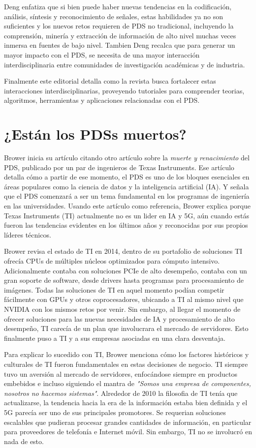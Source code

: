 \documentclass[11pt, twocolumn]{article}
\begin{document}
Deng enfatiza que si bien puede haber nuevas tendencias en la codificación, análisis, síntesis y reconocimiento de señales, estas habilidades ya no son suficientes y los nuevos retos requieren de PDS no tradicional, incluyendo la comprensión, minería y extracción de información de alto nivel muchas veces inmersa en fuentes de bajo nivel. Tambien Deng recalca que para generar un mayor impacto con el PDS, se necesita de una mayor interacción interdisciplinaria entre comunidades de investigación académicas y de industria.

Finalmente este editorial detalla como la revista busca fortalecer estas interacciones interdisciplinarias, proveyendo tutoriales para comprender teorias, algoritmos, herramientas y aplicaciones relacionadas con el PDS.

\section{¿Están los PDSs muertos?}
Brower \cite{dps_dead} inicia su artículo citando otro artículo sobre la \textit{muerte y renacimiento} del PDS, publicado por un par de ingenieros de Texas Instruments. Ese artículo detalla cómo a partir de ese momento, el PDS es uno de los bloques esenciales en áreas populares como la ciencia de datos y la inteligencia artificial (IA). Y señala que el PDS comenzará a ser un tema fundamental en los programas de ingeniería en las universidades. Usando este artículo como referencia, Brower explica porque Texas Instruments (TI) actualmente no es un lider en IA y 5G, aún cuando estás fueron las tendencias evidentes en los últimos años y reconocidas por sus propios líderes técnicos.

Brower revisa el estado de TI en 2014, dentro de su portafolio de soluciones TI ofrecía CPUs de múltiples núcleos optimizados para cómputo intensivo. Adicionalmente contaba con soluciones PCIe de alto desempeño, contaba con un gran soporte de software, desde drivers hasta programas para procesamiento de imágenes. Todas las soluciones de TI en aquel momento podían competir fácilmente con GPUs y otros coprocesadores, ubicando a TI al mismo nivel que NVIDIA con los mismos retos por venir. Sin embargo, al llegar el momento de ofrecer soluciones para las nuevas necesidades de IA y procesamiento de alto desempeño, TI carecía de un plan que involucrara el mercado de servidores. Esto finalmente puso a TI y a sus empresas asociadas en una clara desventaja.

Para explicar lo sucedido con TI, Brower menciona cómo los factores históricos y culturales de TI fueron fundamentales en estas decisiones de negocio. TI siempre tuvo un aversión al mercado de servidores, enfocándose siempre en productos embebidos e incluso siguiendo el mantra de \textit{"Somos una empresa de componentes, nosotros no hacemos sistemas"}. Alrededor de 2010 la filosofia de TI tenía que actualizarse, la tendencia hacia la era de la información estaba bien definida y el 5G parecía ser uno de sus principales promotores. Se requerian soluciones escalables que pudieran procesar grandes cantidades de información, en particular para proveedores de telefonía e Internet móvil. Sin embargo, TI no se involucró en nada de esto.
\end{document}
